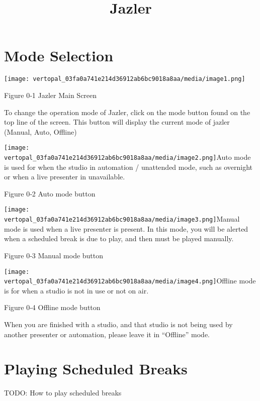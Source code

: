 \documentclass[
]{article}
\title{Jazler}
\author{}
\date{}
\begin{document}
\maketitle

\hypertarget{mode-selection}{%
\section{Mode Selection}\label{mode-selection}}

\texttt{[image: vertopal\_03fa0a741e214d36912ab6bc9018a8aa/media/image1.png]}

Figure 0‑1 Jazler Main Screen

To change the operation mode of Jazler, click on the mode button found
on the top line of the screen. This button will display the current mode
of jazler (Manual, Auto, Offline)

\texttt{[image: vertopal\_03fa0a741e214d36912ab6bc9018a8aa/media/image2.png]}Auto
mode is used for when the studio in automation / unattended mode, such
as overnight or when a live presenter in unavailable.

Figure 0‑2 Auto mode button

\texttt{[image: vertopal\_03fa0a741e214d36912ab6bc9018a8aa/media/image3.png]}Manual
mode is used when a live presenter is present. In this mode, you will be
alerted when a scheduled break is due to play, and then must be played
manually.

Figure 0‑3 Manual mode button

\texttt{[image: vertopal\_03fa0a741e214d36912ab6bc9018a8aa/media/image4.png]}Offline
mode is for when a studio is not in use or not on air.

Figure 0‑4 Offline mode button

When you are finished with a studio, and that studio is not being used
by another presenter or automation, please leave it in ``Offline'' mode.

\hypertarget{playing-scheduled-breaks}{%
\section{Playing Scheduled Breaks}\label{playing-scheduled-breaks}}

TODO: How to play scheduled breaks
\end{document}
